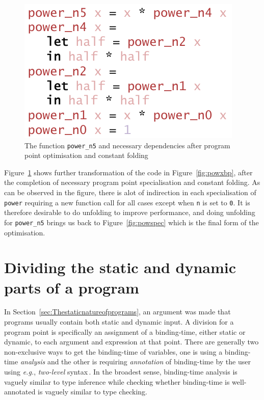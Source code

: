 \documentclass{ituthesis}
\newcommand{\ttdec}[1]{\textcolor{declared-var-color}{\texttt{#1}}}
\newcommand{\ttvar}[1]{\textcolor{local-var-color}{\texttt{#1}}}
\newcommand{\ttliteral}[1]{\textcolor{literal-color}{\texttt{#1}}}
\theoremstyle{break}
\begin{document}
\begin{figure}[ht]
\begin{center}
    \includegraphics[scale=0.5]{Figures/PowerExampleBranchUnfolding1.png}
\end{center}
\caption{The function \ttdec{power\_n5} and necessary dependencies after program point optimisation
and constant folding}
\label{fig:powxuf}
\end{figure}

Figure~\ref{fig:powxuf} shows further transformation of the code in Figure~\ref{fig:powxbp}, after the completion of necessary program point specialisation and constant folding.
As can be observed in the figure, there is alot of indirection in each specialisation of \ttdec{power} requiring a new function call for all cases except when \ttvar{n} is set to \ttliteral{0}.
It is therefore desirable to do unfolding to improve performance, and doing unfolding for \ttdec{power\_n5} brings us back to Figure~\ref{fig:powspec} which is the final form of the optimisation.


\section{Dividing the static and dynamic parts of a program}
\label{sec:Binding-timeAnalysisofPrograms}
In Section~\ref{sec:Thestaticnatureofprograms}, an argument was made that programs usually contain both static and dynamic input.
A division for a program point is specifically an assignment of a binding-time, either static or dynamic, to each argument and expression at that point.
There are generally two non-exclusive ways to get the binding-time of variables, one is using a binding-time \textit{analysis}
and the other is requiring \textit{annotation} of binding-time by the user using \textit{e.g.}, \textit{two-level} syntax\,\autocite{Nielson:1989:TSA:75491.75492,Jones:1993:PEA:153676}.
In the broadest sense, binding-time analysis is vaguely similar to type inference while checking whether binding-time is well-annotated is vaguely similar to type checking.
\end{document}
